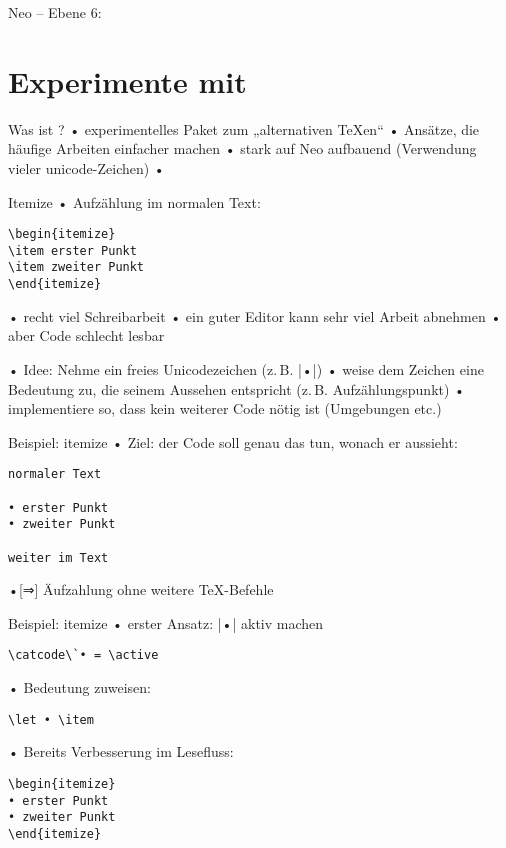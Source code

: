 \documentclass[t]{beamer}
\begin{document}
\begin{frame}{Neo – Ebene 6:}

\end{frame} 

\section{Experimente mit \altTeX}
\begin{frame}{Was ist \altTeX?}
• experimentelles Paket zum „alternativen \TeX en“
• Ansätze, die häufige Arbeiten einfacher machen
• stark auf Neo aufbauend (Verwendung vieler unicode-Zeichen)
• 
\•
\end{frame}

\begin{frame}[fragile]{Itemize}
• Aufzählung im normalen Text:
\begin{verbatim}
\begin{itemize}
\item erster Punkt
\item zweiter Punkt
\end{itemize}
\end{verbatim}
• recht viel Schreibarbeit
• ein guter Editor kann sehr viel Arbeit abnehmen
• aber Code schlecht lesbar
\•
\end{frame}

\begin{frame}[fragile]
• Idee: Nehme ein freies Unicodezeichen (z.\,B. |•|)
• weise dem Zeichen eine Bedeutung zu, die seinem Aussehen entspricht (z.\,B. Aufzählungspunkt)
• implementiere so, dass kein weiterer Code nötig ist (Umgebungen etc.)
\•
\end{frame}

\begin{frame}[fragile]{Beispiel: itemize}
• Ziel: der Code soll genau das tun, wonach er aussieht:
\begin{verbatim}
normaler Text

• erster Punkt
• zweiter Punkt

weiter im Text
\end{verbatim}
•[⇒] Äufzahlung ohne weitere \TeX-Befehle
\•
\end{frame}

\begin{frame}[fragile]{Beispiel: itemize}
• erster Ansatz: |•| aktiv machen
\begin{verbatim}
\catcode\`• = \active
\end{verbatim}
\pause
• Bedeutung zuweisen:
\begin{verbatim}
\let • \item
\end{verbatim}
• Bereits Verbesserung im Lesefluss:
\begin{verbatim}
\begin{itemize}
• erster Punkt
• zweiter Punkt
\end{itemize}
\end{verbatim}
\•
\end{frame}
\end{document}
